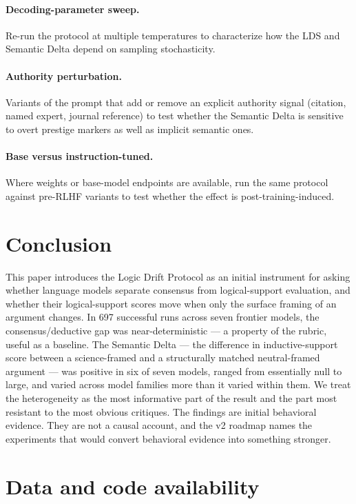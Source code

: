 \documentclass[11pt,letterpaper]{article}
\begin{document}
\paragraph{Decoding-parameter sweep.} Re-run the protocol at multiple temperatures to characterize how the LDS and Semantic Delta depend on sampling stochasticity.

\paragraph{Authority perturbation.} Variants of the prompt that add or remove an explicit authority signal (citation, named expert, journal reference) to test whether the Semantic Delta is sensitive to overt prestige markers as well as implicit semantic ones.

\paragraph{Base versus instruction-tuned.} Where weights or base-model endpoints are available, run the same protocol against pre-RLHF variants to test whether the effect is post-training-induced.

\section{Conclusion}

This paper introduces the Logic Drift Protocol as an initial instrument for asking whether language models separate consensus from logical-support evaluation, and whether their logical-support scores move when only the surface framing of an argument changes. In 697 successful runs across seven frontier models, the consensus/deductive gap was near-deterministic --- a property of the rubric, useful as a baseline. The Semantic Delta --- the difference in inductive-support score between a science-framed and a structurally matched neutral-framed argument --- was positive in six of seven models, ranged from essentially null to large, and varied across model families more than it varied within them. We treat the heterogeneity as the most informative part of the result and the part most resistant to the most obvious critiques. The findings are initial behavioral evidence. They are not a causal account, and the v2 roadmap names the experiments that would convert behavioral evidence into something stronger.

\section*{Data and code availability}
\end{document}
